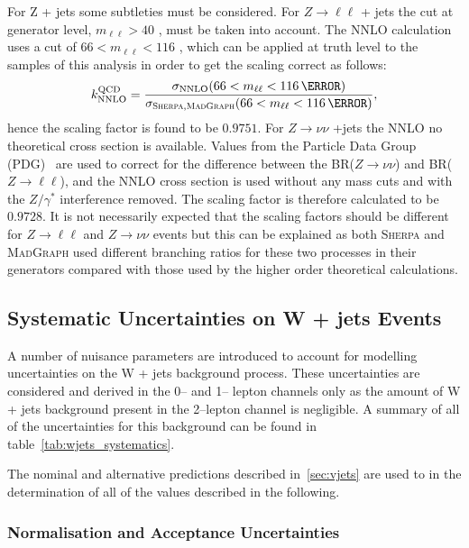 For Z + jets some subtleties must be considered. For $Z \to \ell\ell$ + jets the
cut at generator level, $m_{\ell\ell}>40$ \GeV, must be taken into account. The
NNLO calculation uses a cut of $66<m_{\ell\ell}<116$ \GeV, which can be applied
at truth level to the samples of this analysis in order to get the scaling
correct as follows:
\begin{equation}
  k_{\text{NNLO}}^{\text{QCD}} = \frac{\sigma_{\text{NNLO}}(66<m_{\ell\ell}<116\,{\GeV})}{\sigma_{\textsc{Sherpa},\textsc{MadGraph}}(66<m_{\ell\ell}<116\,{\GeV})},
  \label{eq:nnlo-vjets-k}
\end{equation}
hence the scaling factor is found to be $0.9751$. For $Z \to \nu\nu$ +jets the
NNLO no theoretical cross section is available. Values from the
Particle Data Group (PDG)~\cite{PDG} are used to correct for the difference
between the BR($Z \to \nu\nu$) and BR($Z \to \ell\ell$), and the NNLO cross
section is used without any mass cuts and with the $Z/\gamma^*$ interference
removed. The scaling factor is therefore calculated to be $0.9728$. It is not
necessarily expected that the scaling factors should be different for $Z \to
\ell \ell$ and $Z \to \nu \nu$ events but this can be explained as both
\textsc{Sherpa} and \textsc{MadGraph} used different branching ratios for these
two processes in their generators compared with those used by the higher order
theoretical calculations.

\subsection{Systematic Uncertainties on W + jets Events}
A number of nuisance parameters are introduced to account for modelling
uncertainties on the W + jets background process. These uncertainties are
considered and derived in the 0-- and 1-- lepton channels only as the amount of
W + jets background present in the 2--lepton channel is negligible. A summary of
all of the uncertainties for this background can be found in
table~\ref{tab:wjets_systematics}.

The nominal and alternative predictions described in~\ref{sec:vjets} are used to
in the determination of all of the values described in the following. 

\subsubsection{Normalisation and Acceptance Uncertainties}


